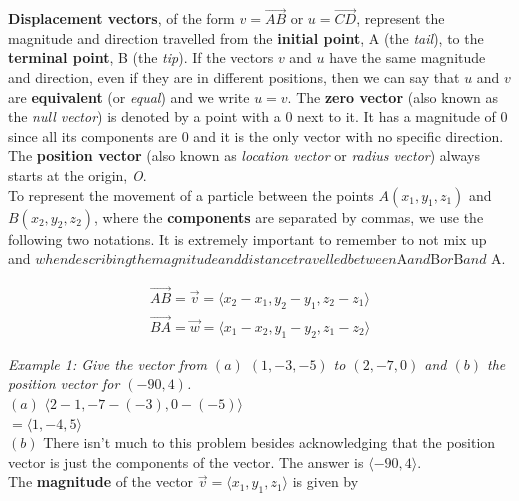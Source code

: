 \documentclass{article}
\begin{document}
            \noindent\textbf{Displacement vectors}, of the form $v=\overrightarrow{AB}$ or
            $u=\overrightarrow{CD}$, represent the magnitude and direction travelled from the
            \textbf{initial point}, A (the \emph{tail}), to the \textbf{terminal point}, B
            (the \emph{tip}). If the vectors $v$ and $u$ have the same magnitude and direction,
            even if they are in different positions, then we can say that $u$ and $v$ are
            \textbf{equivalent} (or \emph{equal}) and we write \textbf{$u=v$}. The
            \textbf{zero vector} (also known as the \emph{null vector}) is denoted by a point with a
            0 next to it. It has a magnitude of 0 since all its components are 0 and it is the only
            vector with no specific direction. The \textbf{position vector}
            (also known as \emph{location vector} or \emph{radius vector}) always starts at the
            origin, \emph{O}.\\

            \noindent To represent the movement of a particle between the points $A(x_1,y_1,z_1)$
            and $B(x_2,y_2,z_2)$, where the \textbf{components} are separated by commas, we use the
            following two notations. It is extremely important to remember to not mix up
             and 
            $when describing the magnitude and distance travelled between $A$ and $B$ or $B$ and $ A.

            \begin{align*}
                \overrightarrow{AB} = \overrightarrow{v} = \langle x_2-x_1, y_2-y_1, z_2-z_1\rangle\\
                \overrightarrow{BA} = \overrightarrow{w} = \langle x_1-x_2, y_1-y_2, z_1-z_2\rangle
            \end{align*}

            \noindent \color{blue} \textit{Example 1: Give the vector from $(a)$ $(1,-3,-5)$ to
            $(2,-7,0)$ and $(b)$ the position vector for $(-90,4)$.} \color{black} \\
            $(a)$ $\langle2-1,-7-(-3),0-(-5)\rangle$\\
            $=\langle1,-4,5\rangle$\\
            $(b)$ There isn't much to this problem besides acknowledging that the position vector
            is just the components of the vector. The answer is $\langle-90,4\rangle$. \\

            \noindent The \textbf{magnitude} of the vector
            $\overrightarrow{v}=\langle x_1,y_1,z_1\rangle$ is given by
\end{document}
